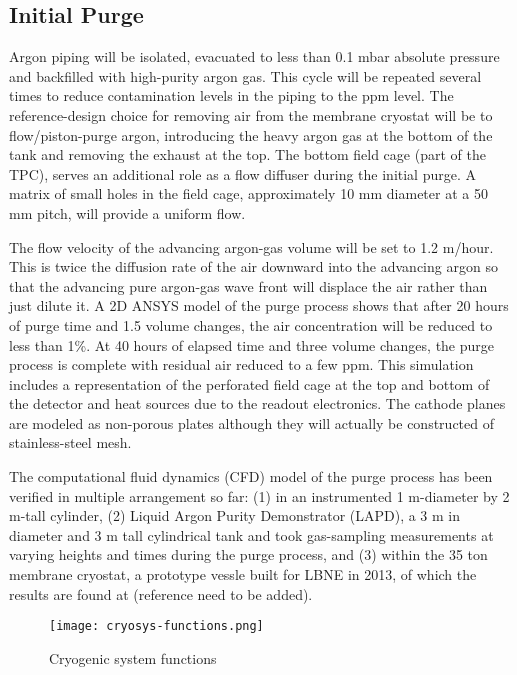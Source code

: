 \subsection{Initial Purge} 

Argon piping will be isolated, evacuated to less than 0.1 mbar absolute pressure and backfilled
with high-purity argon gas. This cycle will be repeated several times to reduce contamination
levels in the piping to the ppm level. The reference-design choice for removing air from the
membrane cryostat will be to flow/piston-purge argon, introducing the heavy argon gas at the
bottom of the tank and removing the exhaust at the top. The bottom field cage (part of the
TPC), serves an additional role as a flow diffuser during the initial
purge. A matrix of small holes in the field cage, approximately
10 mm diameter at a 50 mm pitch, will provide a uniform flow. 

The flow velocity of the advancing argon-gas volume will be set to 1.2 m/hour. 
This is twice the diffusion rate of the air downward into the advancing argon 
so that the advancing pure argon-gas wave front will displace the air rather 
than just dilute it. A 2D ANSYS model of the purge process shows that after 
20 hours of purge time and 1.5 volume changes, the air concentration will 
be reduced to less than 1\%. At 40 hours of elapsed time and three volume
changes, the purge process is complete with residual air reduced to a few ppm. This
simulation includes a representation of the perforated field cage at the top and bottom of the
detector and heat sources due to the readout electronics. The cathode
planes are modeled as non-porous plates although they will actually be constructed of stainless-steel
mesh.

The computational fluid dynamics (CFD) model of the purge process has been verified in multiple arrangement so far: (1) in an instrumented 1 m-diameter by 2 m-tall cylinder, (2) Liquid Argon Purity Demonstrator (LAPD), a 3 m in diameter and 3 m tall cylindrical tank and took gas-sampling measurements at varying heights and times during the purge process, and (3) within the 35 ton membrane cryostat, a prototype vessle built for LBNE in 2013, of which the results are found at (reference need to be added). \begin{figure}[htbp]
\centering
\texttt{[image: cryosys-functions.png]} 
\caption{Cryogenic system functions}
\label{fig:v5ch2-LBNF-block-diagram-2014}
\end{figure}


